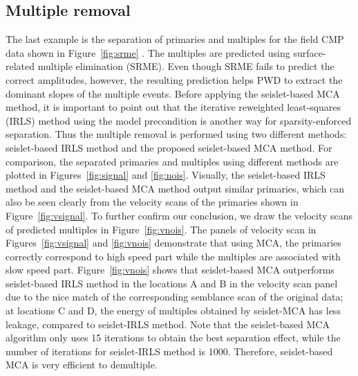 
% 
  

\subsection{Multiple removal}

The last example is the separation of primaries and multiples for the field CMP data shown in Figure~\ref{fig:srme} \citep{fomel2006regularizing}. The multiples are predicted using surface-related multiple elimination (SRME). Even though SRME fails to predict the correct amplitudes, however, the resulting prediction helps PWD to extract the dominant slopes of the multiple events. 
Before applying the seislet-based MCA method, it is important to point out that the iterative reweighted least-squares (IRLS) method using the model precondition is another way for sparsity-enforced separation. Thus the multiple removal is performed using two different methods: seislet-based IRLS method and the proposed seislet-based MCA method. For comparison, the separated primaries and multiples using different methods are plotted in Figures~\ref{fig:signal} and \ref{fig:nois}. Visually, the seislet-based IRLS method and the seislet-based MCA method output similar primaries, which can also be seen clearly from the velocity scans of the primaries shown in Figure~\ref{fig:vsignal}. To further confirm our conclusion, we draw the velocity scans of predicted multiples in Figure~\ref{fig:vnois}. The panels of velocity scan in Figures~\ref{fig:vsignal} and \ref{fig:vnois} demonstrate that using MCA, the primaries correctly correspond to high speed part while the multiples are associated with slow speed part. Figure~\ref{fig:vnois} shows that seislet-based MCA outperforms seislet-based IRLS method in the locations A and B in the velocity scan panel due to the nice match of the corresponding semblance scan of the original data; at locations C and D, the energy of multiples obtained by seislet-MCA has less leakage, compared to seislet-IRLS method. Note that the seislet-based MCA algorithm only uses 15 iterations to obtain the best separation effect, while the number of iterations for seislet-IRLS method is 1000. Therefore, seislet-based MCA is very efficient to demultiple.


